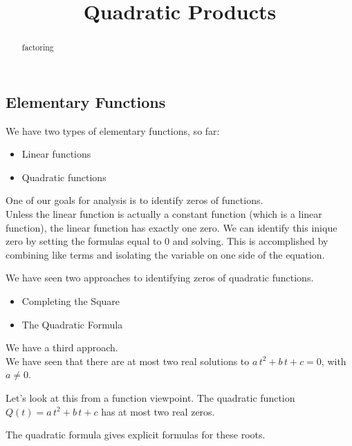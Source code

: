 \documentclass{ximera}
\title{Quadratic Products}
\begin{document}
\begin{abstract}
factoring
\end{abstract}
\maketitle







\subsection{Elementary Functions}

We have two types of elementary functions, so far:

\begin{itemize}
\item Linear functions
\item Quadratic functions
\end{itemize}

One of our goals for analysis is to identify zeros of functions. \\

Unless the linear function is actually a constant function (which is a linear function), the linear function has exactly one zero. We can identify this inique zero by setting the formulas equal to $0$ and solving.  This is accomplished by combining like terms and isolating the variable on one side of the equation.

We have seen two approaches to identifying zeros of quadratic functions.
\begin{itemize}
\item Completing the Square
\item {The Quadratic Formula}
\end{itemize}

We have a third approach. \\









We have seen that there are at most two real solutions to $a \, t^2 + b \, t + c = 0$, with $a \ne 0$. 

Let's look at this from a function viewpoint.  The quadratic function  $Q(t) = a \, t^2 + b \, t + c$ has at most two real zeros.  

The quadratic formula gives explicit formulas for these roots.
\end{document}
